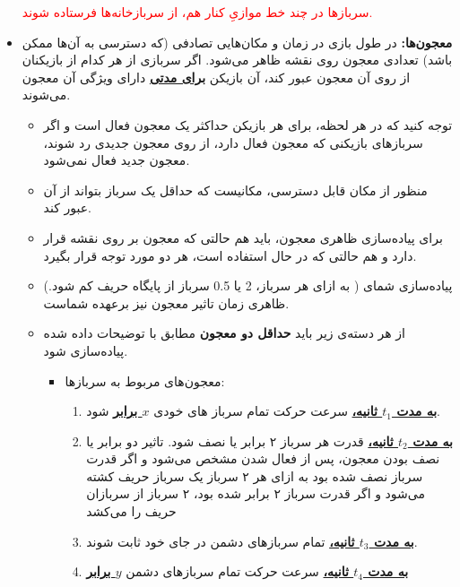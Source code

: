 \documentclass[]{article}
\begin{document}
\begin{itemize}
{\begin{itemize}
{\textcolor{red}{سربازها در چند خط موازیِ کنار هم، از سربازخانه‌ها فرستاده شوند.
}
    }
\end{itemize}
}
\item{
\textbf{معجون‌ها:
}
\newline
در طول بازی در زمان و مکان‌هایی تصادفی (که دسترسی به آن‌ها ممکن باشد) تعدادی معجون
روی نقشه ظاهر می‌شود. اگر سربازی از هر کدام از بازیکنان از روی آن معجون عبور کند، آن بازیکن
\textbf{\underline{برای مدتی}}
دارای ویژگی آن معجون می‌شوند.
\begin{itemize}
    \item{
توجه کنید که در هر لحظه، برای هر بازیکن حداکثر یک معجون فعال است و اگر سربازهای بازیکنی که معجون فعال دارد، از روی معجون جدیدی رد شوند، معجون جدید فعال نمی‌شود.
    }
    \item{
منظور از مکان قابل دسترسی، مکانیست که حداقل یک سرباز بتواند از آن عبور کند.
    }
    \item{
    	برای پیاده‌سازی ظاهری معجون، باید هم حالتی که معجون بر روی نقشه قرار دارد و هم حالتی که در حال استفاده است، هر دو مورد توجه قرار بگیرد.
    }
    \item{
پیاده‌سازی شمای ( به ازای هر سرباز، 2 یا 0.5 سرباز از پایگاه حریف کم شود.) ظاهری زمان تاثیر معجون نیز بر‌عهده‌ شماست.
    }
    \item{
    از هر دسته‌ی زیر باید
    \textbf{حداقل دو معجون}
    مطابق با توضیحات داده شده پیاده‌سازی شود.
    \begin{itemize}
        \item{
        معجون‌های مربوط به سربازها:
        \begin{enumerate}
            \item{
            \textbf{\underline{به مدت $t_1$ ثانیه،}}
            سرعت حرکت تمام سرباز های خودی
            \textbf{\underline{$x$ برابر}}
            شود.
            }
            \item{
            \textbf{\underline{به مدت $t_2$ ثانیه،}}
            قدرت هر سرباز ۲ برابر یا نصف شود. تاثیر دو برابر یا نصف بودن معجون، پس از فعال شدن مشخص می‌شود و اگر قدرت سرباز نصف شده بود به ازای هر ۲ سرباز یک سرباز حریف کشته می‌شود و اگر قدرت سرباز ۲ برابر شده بود، ۲ سرباز از سربازان حریف را می‌کشد
            }
            \item{
            \textbf{\underline{به مدت $t_3$ ثانیه،}}
            تمام سربازهای دشمن در جای خود ثابت شوند.
            }
            \item{
            \textbf{\underline{به مدت $t_4$ ثانیه،}}
            سرعت حرکت تمام سربازهای دشمن
            \textbf{\underline{$y$ برابر}}
}
\end{enumerate}}
\end{itemize}}
\end{itemize}}
\end{itemize}
\end{document}
